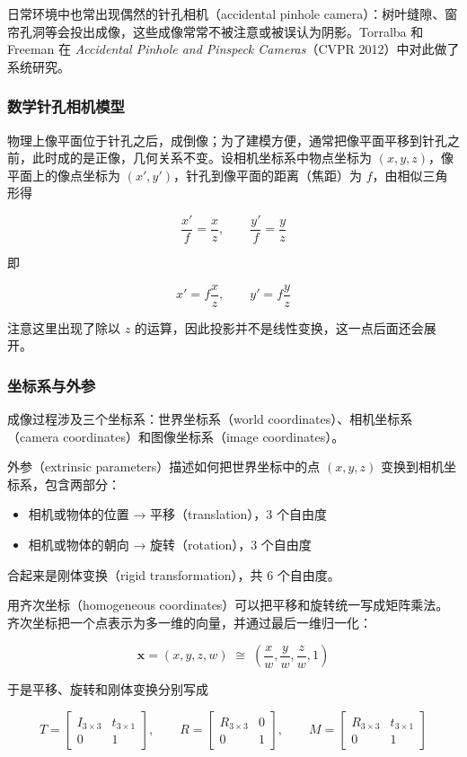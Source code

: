 \documentclass{ctexart}
\begin{document}
日常环境中也常出现偶然的针孔相机（accidental pinhole camera）：树叶缝隙、窗帘孔洞等会投出成像，这些成像常常不被注意或被误认为阴影。Torralba 和 Freeman 在 \textit{Accidental Pinhole and Pinspeck Cameras}（CVPR 2012）中对此做了系统研究。

\subsubsection{数学针孔相机模型}

物理上像平面位于针孔之后，成倒像；为了建模方便，通常把像平面平移到针孔之前，此时成的是正像，几何关系不变。设相机坐标系中物点坐标为 $(x,y,z)$，像平面上的像点坐标为 $(x',y')$，针孔到像平面的距离（焦距）为 $f$，由相似三角形得

\[
\frac{x'}{f} = \frac{x}{z}, \qquad \frac{y'}{f} = \frac{y}{z}
\]

即

\[
x' = f\frac{x}{z}, \qquad y' = f\frac{y}{z}
\]

注意这里出现了除以 $z$ 的运算，因此投影并不是线性变换，这一点后面还会展开。

\subsubsection{坐标系与外参}

成像过程涉及三个坐标系：世界坐标系（world coordinates）、相机坐标系（camera coordinates）和图像坐标系（image coordinates）。

外参（extrinsic parameters）描述如何把世界坐标中的点 $(x,y,z)$ 变换到相机坐标系，包含两部分：

\begin{itemize}
    \item 相机或物体的位置 → 平移（translation），3 个自由度
    \item 相机或物体的朝向 → 旋转（rotation），3 个自由度
\end{itemize}

合起来是刚体变换（rigid transformation），共 6 个自由度。

用齐次坐标（homogeneous coordinates）可以把平移和旋转统一写成矩阵乘法。齐次坐标把一个点表示为多一维的向量，并通过最后一维归一化：

\[
\boldsymbol{x} = (x, y, z, w) \;\cong\; \left(\frac{x}{w}, \frac{y}{w}, \frac{z}{w}, 1\right)
\]

于是平移、旋转和刚体变换分别写成

\[
T = \begin{bmatrix} I_{3\times3} & t_{3\times1} \\ 0 & 1 \end{bmatrix}, \qquad
R = \begin{bmatrix} R_{3\times3} & 0 \\ 0 & 1 \end{bmatrix}, \qquad
M = \begin{bmatrix} R_{3\times3} & t_{3\times1} \\ 0 & 1 \end{bmatrix}
\]
\end{document}

